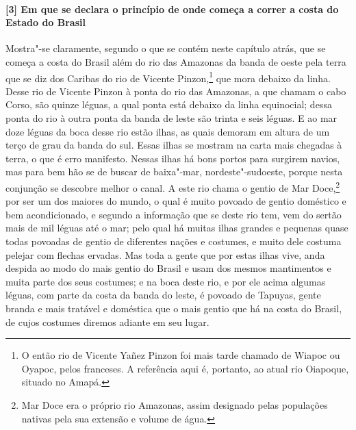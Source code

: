 \begin{linenumbers}
\paragraph{[3] Em que se declara o princípio de onde começa a correr a costa do Estado do
Brasil} \quad
Mostra"-se claramente, segundo o que se contém neste capítulo atrás, que se começa a costa
do Brasil além do rio das Amazonas da banda de oeste pela terra que se diz dos Caribas do
rio de Vicente Pinzon,\footnote{ O então rio de Vicente Yañez Pinzon foi mais tarde
chamado de Wiapoc ou Oyapoc, pelos franceses. A referência aqui é, portanto, ao atual rio
Oiapoque, situado no Amapá.} que mora debaixo da linha. Desse rio de Vicente Pinzon à
ponta do rio das Amazonas, a que chamam o cabo Corso, são quinze léguas, a qual ponta está
debaixo da linha equinocial; dessa ponta do rio à outra ponta da banda de leste são trinta
e seis léguas. E ao mar doze léguas da boca desse rio estão ilhas, as quais demoram em
altura de um terço de grau da banda do sul. Essas ilhas se mostram na carta mais chegadas
à terra, o que é erro manifesto. Nessas ilhas há bons portos para surgirem navios, mas
para bem hão se de buscar de baixa"-mar, nordeste"-sudoeste, porque nesta conjunção se
descobre melhor o canal. A este rio chama o gentio de Mar Doce,\footnote{ Mar Doce era o
próprio rio Amazonas, assim designado pelas populações nativas pela sua extensão e volume
de água.} por ser um dos maiores do mundo, o qual é muito povoado de gentio doméstico e
bem acondicionado, e segundo a informação que se deste rio tem, vem do sertão mais de mil
léguas até o mar; pelo qual há muitas ilhas grandes e pequenas quase todas povoadas de
gentio de diferentes nações e costumes, e muito dele costuma pelejar com flechas ervadas.
Mas toda a gente que por estas ilhas vive, anda despida ao modo do mais gentio do Brasil e
usam dos mesmos mantimentos e muita parte dos seus costumes; e na boca deste rio, e por
ele acima algumas léguas, com parte da costa da banda do leste, é povoado de Tapuyas,
gente branda e mais tratável e doméstica que o mais gentio que há na costa do Brasil, de
cujos costumes diremos adiante em seu lugar.


\end{linenumbers}
